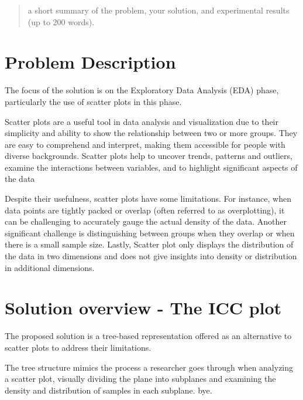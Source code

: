 \documentclass[12pt]{article}
\begin{document}
\maketitle

\begin{abstract}
a short summary of the problem, your solution, and experimental results (up to 200 words).
\end{abstract}

\section{Problem Description}\label{Problem Description}
The focus of the solution is on the Exploratory Data Analysis (EDA) phase, particularly the use of scatter plots in this phase.

Scatter plots are a useful tool in data analysis and visualization due to their simplicity and ability to show the relationship between two or more groups. They are easy to comprehend and interpret, making them accessible for people with diverse backgrounds. Scatter plots help to uncover trends, patterns and outliers, examine the interactions between variables, and to highlight significant aspects of the data

Despite their usefulness, scatter plots have some limitations. For instance, when data points are tightly packed or overlap (often referred to as overplotting), it can be challenging to accurately gauge the actual density of the data. Another significant challenge is distinguishing between groups when they overlap or when there is a small sample size. Lastly, Scatter plot only displays the distribution of the data in two dimensions and does not give insights into density or distribution in additional dimensions.

\section{Solution overview - The ICC plot}\label{Solution overview}
The proposed solution is a tree-based representation offered as an alternative to scatter plots to address their limitations.

The tree structure mimics the process a researcher goes through when analyzing a scatter plot, visually dividing the plane into subplanes and examining the density and distribution of samples in each subplane.  bye.
\end{document}
